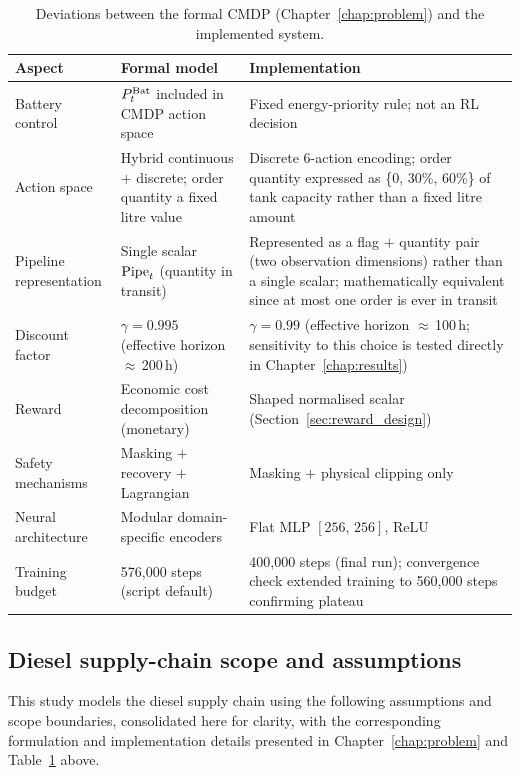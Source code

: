 \begin{table}[htb]
\centering
\small
\caption{Deviations between the formal CMDP (Chapter~\ref{chap:problem})
and the implemented system.}
\label{tab:deviations}
\begin{tabular}{p{2.8cm}p{4.6cm}p{4.6cm}}
\toprule
\textbf{Aspect} & \textbf{Formal model} & \textbf{Implementation} \\
\midrule
Battery control
  & $P_t^{\mathrm{Bat}}$ included in CMDP action space
  & Fixed energy-priority rule; not an RL decision \\[4pt]
Action space
  & Hybrid continuous $+$ discrete; order quantity a fixed litre value
  & Discrete 6-action encoding; order quantity expressed as \{0, 30\%,
    60\%\} of tank capacity rather than a fixed litre amount \\[4pt]
Pipeline representation
  & Single scalar $\mathrm{Pipe}_t$ (quantity in transit)
  & Represented as a flag $+$ quantity pair (two observation
    dimensions) rather than a single scalar; mathematically
    equivalent since at most one order is ever in transit \\[4pt]
Discount factor
  & $\gamma = 0.995$ (effective horizon $\approx$\,200\,h)
  & $\gamma = 0.99$ (effective horizon $\approx$\,100\,h; sensitivity to
    this choice is tested directly in Chapter~\ref{chap:results}) \\[4pt]
Reward
  & Economic cost decomposition (monetary)
  & Shaped normalised scalar (Section~\ref{sec:reward_design}) \\[4pt]
Safety mechanisms
  & Masking $+$ recovery $+$ Lagrangian
  & Masking $+$ physical clipping only \\[4pt]
Neural architecture
  & Modular domain-specific encoders
  & Flat MLP $[256,\,256]$, ReLU \\[4pt]
Training budget
  & 576{,}000 steps (script default)
  & 400{,}000 steps (final run); convergence check extended training to
    560{,}000 steps confirming plateau \\
\bottomrule
\end{tabular}
\end{table}

\subsection{Diesel supply-chain scope and assumptions}
\label{sec:supply_chain_scope}

This study models the diesel supply chain using the following
assumptions and scope boundaries, consolidated here for clarity, with
the corresponding formulation and implementation details presented in
Chapter~\ref{chap:problem} and Table~\ref{tab:deviations} above.

